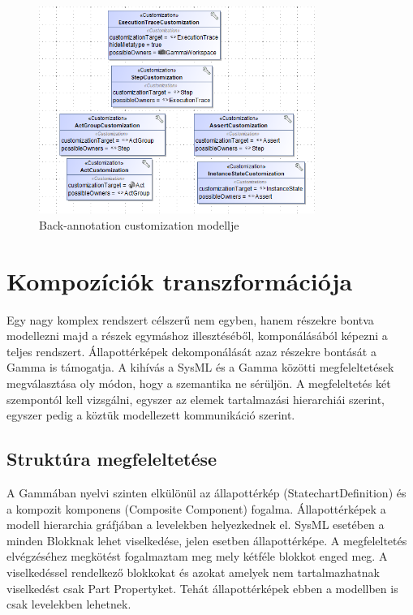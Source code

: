 \begin{figure}[!ht]
	\centering
	\includegraphics[width=90mm, keepaspectratio]{figures/contribution/trace-profile.png}
	\caption{Back-annotation customization modellje}
	\label{fig:contribution-trace-customization}
\end{figure}
 
 \newpage


\section{Kompozíciók transzformációja}

Egy nagy komplex rendszert célszerű nem egyben, hanem részekre bontva modellezni majd a részek egymáshoz illesztéséből, komponálásából képezni a teljes rendszert. Állapottérképek dekomponálását azaz részekre bontását a Gamma is támogatja. A kihívás a SysML és a Gamma közötti megfeleltetések megválasztása oly módon, hogy a szemantika ne sérüljön. A megfeleltetés két szempontól kell vizsgálni, egyszer az elemek tartalmazási hierarchiái szerint, egyszer pedig a köztük modellezett kommunikáció szerint.



\subsection{Struktúra megfeleltetése}
A Gammában nyelvi szinten elkülönül az állapottérkép (StatechartDefinition) és a kompozit komponens (Composite Component) fogalma. Állapottérképek a modell hierarchia gráfjában a levelekben helyezkednek el. SysML esetében a minden Blokknak lehet viselkedése, jelen esetben állapottérképe. A megfeleltetés elvégzéséhez megkötést fogalmaztam meg mely kétféle blokkot enged meg. A viselkedéssel rendelkező blokkokat és azokat amelyek nem tartalmazhatnak viselkedést csak Part Propertyket. Tehát állapottérképek ebben a modellben is csak levelekben lehetnek.

